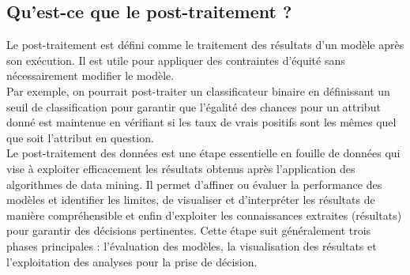 \documentclass[a4paper, 12pt]{article}
\begin{document}
	\subsection{Qu'est-ce que le post-traitement ?}Le post-traitement est défini comme le traitement des résultats d'un modèle après son exécution. Il est utile pour appliquer des contraintes d'équité sans nécessairement modifier le modèle. \\
	Par exemple, on pourrait post-traiter un classificateur binaire en définissant un seuil de classification pour garantir que l’égalité des chances pour un attribut donné est maintenue en vérifiant si les taux de vrais positifs sont les mêmes quel que soit l’attribut en question.\\
	Le post-traitement des données est une étape essentielle en fouille de données qui vise à exploiter efficacement les résultats obtenus après l'application des algorithmes de data mining. Il permet d'affiner ou évaluer la performance des modèles et identifier les limites, de  visualiser et d'interpréter les résultats de manière compréhensible et enfin d’exploiter les connaissances extraites (résultats) pour garantir des décisions pertinentes. Cette étape suit généralement trois phases principales : l’évaluation des modèles, la visualisation des résultats et l’exploitation des analyses pour la prise de décision.
\end{document}
